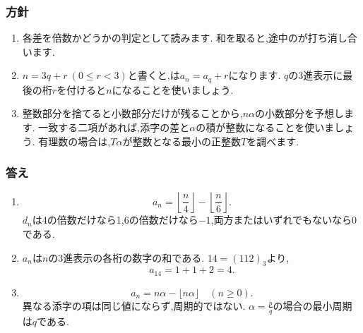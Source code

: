 \subsubsection{方針}\label{節：ガウス記号の関連問題：方針}
\begin{enumerate}[label=\textbf{問\arabic*.},leftmargin=3.8em,format=\bookitemlink{practice-gauss}{hint}{answer}]
  \item 各差を倍数かどうかの判定として読みます.
    和を取ると,途中のが打ち消し合います.
  \item $n=3q+r\ (0\le r<3)$と書くと,は$a_n=a_q+r$になります.
    $q$の3進表示に最後の桁$r$を付けると$n$になることを使いましょう.
  \item 整数部分を捨てると小数部分だけが残ることから,$n\alpha$の小数部分を予想します.
    一致する二項があれば,添字の差と$\alpha$の積が整数になることを使いましょう.
    有理数の場合は,$T\alpha$が整数となる最小の正整数$T$を調べます.
\end{enumerate}

\subsubsection{答え}\label{節：ガウス記号の関連問題：答え}
\begin{enumerate}[label=\textbf{問\arabic*.},leftmargin=3.8em,format=\bookitemlink{practice-gauss}{answer}{solution}]
  \item \[
      a_n=\left\lfloor\frac n4\right\rfloor
      -\left\lfloor\frac n6\right\rfloor.
    \]
    $d_n$は4の倍数だけなら1,6の倍数だけなら$-1$,両方またはいずれでもないなら0である.
  \item $a_n$は$n$の3進表示の各桁の数字の和である.
    $14=(112)_3$より,
    \[
      a_{14}=1+1+2=4.
    \]
  \item \[
      a_n=n\alpha-\lfloor n\alpha\rfloor\quad(n\ge0).
    \]
    異なる添字の項は同じ値にならず,周期的ではない.
    $\alpha=\frac pq$の場合の最小周期は$q$である.
\end{enumerate}

